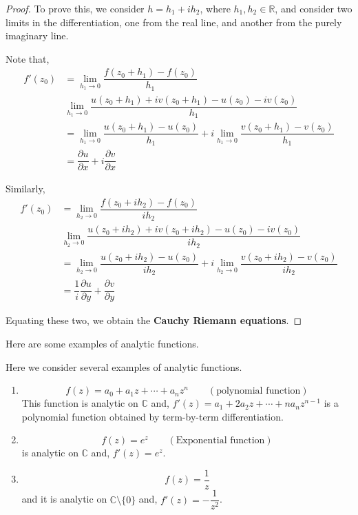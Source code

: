 \documentclass[12pt]{article}
\newcommand{\R}{\mathbb{R}}
\newcommand{\C}{\mathbb{C}}
\theoremstyle{definition}
\newenvironment{example}{
\begin{tcolorbox}[colback=blue!5!white,colframe=blue!75!black, title = Example, parbox = false] }{\end{tcolorbox} }
\begin{document}
\begin{proof}
    To prove this, we consider $h = h_1 + ih_2$, where $h_1, h_2 \in \R$, and consider two limits in the differentiation, one from the real line, and another from the purely imaginary line.
    
    Note that,
    \begin{align*}
        f'(z_0) & = \lim_{h_1 \rightarrow 0} \dfrac{f(z_0 + h_1) - f(z_0)}{h_1}\\
        & \lim_{h_1 \rightarrow 0} \dfrac{u(z_0 + h_1) + iv(z_0 + h_1) - u(z_0) - iv(z_0)}{h_1}\\
        & = \lim_{h_1 \rightarrow 0} \dfrac{u(z_0 + h_1) - u(z_0)}{h_1} + i\lim_{h_1 \rightarrow 0} \dfrac{v(z_0 + h_1) - v(z_0)}{h_1}\\
        & = \dfrac{\partial u}{\partial x} + i \dfrac{\partial v}{\partial x}
    \end{align*}
    
    Similarly,
    \begin{align*}
        f'(z_0) & = \lim_{h_2 \rightarrow 0} \dfrac{f(z_0 + ih_2) - f(z_0)}{ih_2}\\
        & \lim_{h_2 \rightarrow 0} \dfrac{u(z_0 + ih_2) + iv(z_0 + ih_2) - u(z_0) - iv(z_0)}{ih_2}\\
        & = \lim_{h_2 \rightarrow 0} \dfrac{u(z_0 + ih_2) - u(z_0)}{ih_2} + i\lim_{h_2 \rightarrow 0} \dfrac{v(z_0 + ih_2) - v(z_0)}{ih_2}\\
        & = \dfrac{1}{i}\dfrac{\partial u}{\partial y} + \dfrac{\partial v}{\partial y}
    \end{align*}
    
    Equating these two, we obtain the \textbf{Cauchy Riemann equations}.
\end{proof}


Here are some examples of analytic functions.

\begin{example}
    Here we consider several examples of analytic functions.
\begin{enumerate}
    \item \begin{equation*}
        f(z)=a_0 +a_1 z + \cdots +a_n z^n \qquad(\text{polynomial function})
    \end{equation*}
    This function is analytic on $\C$ and, $f'(z)= a_1 +2a_2 z+ \cdots +na_n z^{n-1}$ is a polynomial function obtained by term-by-term differentiation.
    \item \begin{equation*}
        f(z)=e^z\qquad (\text{Exponential function})
    \end{equation*}
    is analytic on $\C$ and, $f'(z)=e^z$.
    \item \begin{equation*}
        f(z)=\dfrac{1}{z}
    \end{equation*} and it is analytic on $\C\setminus\{0\}$ and, $f'(z)=-\dfrac{1}{z^2}$.
\end{enumerate}
\end{example}
\end{document}
